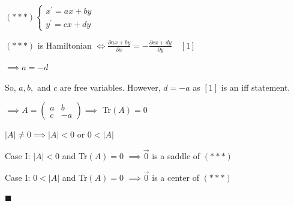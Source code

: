 \documentclass{article}
\begin{document}
\vspace{0.618 em}


$(***)
\begin{cases}
x^\prime = ax+by\\
y^\prime = cx+dy
\end{cases}$

$
(***)$ is Hamiltonian $\iff \frac{\partial ax+by}{\partial x} =
-\frac{\partial cx+dy}{\partial y}\quad [1]
$


$\implies a = -d$

So, $a, b,$ and $c$ are free variables. However, $d = -a$ as $[1]$ is
an iff statement.

$\implies A = \begin{pmatrix}a& b\\ c& -a\end{pmatrix} \implies$ Tr$(A)=0$


$|A| \neq 0 \implies |A| < 0$ or $ 0 < |A|$

Case I: $|A| < 0$ and Tr$(A) = 0$
$\implies \vec{0}$ is a saddle of $(***)$

Case I: $0 < |A|$ and Tr$(A) = 0$
$\implies \vec{0}$ is a center of $(***)$

\vspace{0.618 em}
$\blacksquare$
\end{document}
